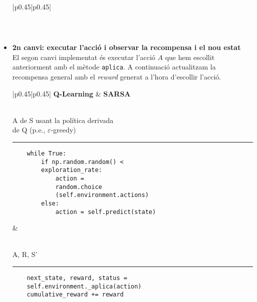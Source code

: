 \documentclass{article}
\begin{document}
\begin{itemize}
\begin{table}[h]
\begin{tabular}{|p{0.45\textwidth}|p{0.45\textwidth}|}
\begin{minipage}{\linewidth}
\begin{verbatim}
\end{verbatim}
\end{minipage} \\
\hline
\end{tabular}
\end{table}
    \item \textbf{2n canvi: executar l'acció  i observar la recompensa  i el nou estat }\\
    El segon canvi implementat és executar l'acció \(A\) que hem escollit anteriorment amb el mètode \verb|aplica|.
    A continuació actualitzam la recompensa general amb el \textit{reward} generat a l'hora d'escollir l'acció.
    \begin{table}[h]
\begin{tabular}{|p{0.45\textwidth}|p{0.45\textwidth}|}
\hline
\textbf{Q-Learning} & \textbf{SARSA} \\
\hline
\begin{minipage}{\linewidth}
\begin{algorithmic}[H]
\STATE {} \\
\qquad {} A de S usant la política derivada\\
\qquad de Q (p.e., $\varepsilon$-greedy)
\end{algorithmic}
\noindent\rule{\linewidth}{0.4pt} 
\begin{verbatim}
    while True:
        if np.random.random() <
        exploration_rate:
            action =
            random.choice
            (self.environment.actions)
        else:
            action = self.predict(state)
\end{verbatim}
\end{minipage}
&
\begin{minipage}{\linewidth}
\begin{algorithmic}[H]
\STATE {}\\
\qquad {} A,  R, S' \\
\end{algorithmic}
\noindent\rule{\linewidth}{0.4pt} 
\begin{verbatim}
    next_state, reward, status =
    self.environment._aplica(action)
    cumulative_reward += reward
\end{verbatim}
\end{minipage} \\
\hline
\end{tabular}
\end{table}

\end{itemize}
\end{document}
